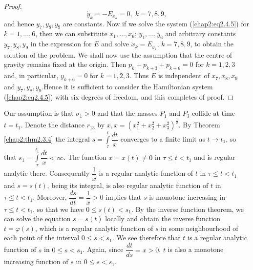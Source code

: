 \begin{proof}
$$
\dot{y}_k = -E_{x_k} =0, \; k = 7,8,9,
$$
and hence $y_7, y_8, y_9$ are constants. Now if we solve the system  (\ref{chap2:eq2.4.5}) for $k = 1,\ldots ,6$, then we can substitute $x_1 , \ldots, x_6$; $y_1, \ldots, y_6$ and arbitrary constants $y_7, y_8,y_9$ in the expression for $E$ and solve $\dot{x}_k = E_{y_k}$, $k = 7,8,9$, to obtain the solution of the problem. We shall now use the assumption that the centre of gravity remains fixed at the origin. Then $p_k + p_{k+3} + p_{k+6} = 0$ for $k = 1,2,3$ and, in particular, $y_{k+6}=0$ for $k = 1,2,3$. Thus $E$ is independent of $x_7, x_8, x_9$ and $y_7, y_8, y_9$.\pageoriginale Hence it is sufficient to consider the Hamiltonian system (\ref{chap2:eq2.4.5}) with six degrees of freedom, and this completes of proof.
\end{proof}

Our assumption is that $\sigma_1 > 0$ and that the masses $P_1$ and $P_3$ collide at time $t = t_1$. Denote the distance $r_{13}$ by $x, x = (x^2_1 + x^2_2 + x^2_3)^{\frac{1}{2}}$. By Theorem \ref{chap2:thm2.3.4} the integral $s = \int\limits^t_\tau \dfrac{dt}{x}$ converges to a finite limit as $t \to t_1$, so that $s_1 = \int\limits^{t_1}_\tau \dfrac{dt}{x} < \infty$. The function $x = x(t) \neq 0$ in $\tau \leq t < t_1$ and is regular analytic there. Consequently $\dfrac{1}{x}$ is a regular analytic function of $t$ in $\tau \leq t < t_1$ and $s = s(t)$, being its integral, is also regular analytic function of $t$ in $\tau \leq t < t_1$. Moreover, $\dfrac{ds}{dt} = \dfrac{1}{x} > 0$ implies that $s$ is monotone increasing in $\tau \leq t < t_1$, so that we have $0 \leq s(t) < s_1$. By the inverse function theorem, we can solve the equation $s = s(t)$ locally and obtain the inverse function $t = \varphi(s)$, which is a regular analytic function of $s$ in some neighbourhood of each point of the interval $0 \leq s < s_1$. We see therefore that $t$ is a regular analytic function of $s$ in $0 \leq s < s_1$. Again, since $\dfrac{dt}{ds} = x>0$, $t$ is also a monotone increasing function of $s$ in $0 \leq s < s_1$.


